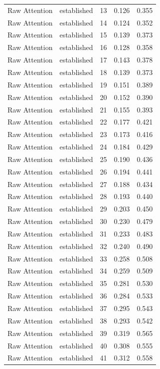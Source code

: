 \begin{tabular}{llrrr}
Raw Attention & established & 13 & 0.126 & 0.355 \\
Raw Attention & established & 14 & 0.124 & 0.352 \\
Raw Attention & established & 15 & 0.139 & 0.373 \\
Raw Attention & established & 16 & 0.128 & 0.358 \\
Raw Attention & established & 17 & 0.143 & 0.378 \\
Raw Attention & established & 18 & 0.139 & 0.373 \\
Raw Attention & established & 19 & 0.151 & 0.389 \\
Raw Attention & established & 20 & 0.152 & 0.390 \\
Raw Attention & established & 21 & 0.155 & 0.393 \\
Raw Attention & established & 22 & 0.177 & 0.421 \\
Raw Attention & established & 23 & 0.173 & 0.416 \\
Raw Attention & established & 24 & 0.184 & 0.429 \\
Raw Attention & established & 25 & 0.190 & 0.436 \\
Raw Attention & established & 26 & 0.194 & 0.441 \\
Raw Attention & established & 27 & 0.188 & 0.434 \\
Raw Attention & established & 28 & 0.193 & 0.440 \\
Raw Attention & established & 29 & 0.203 & 0.450 \\
Raw Attention & established & 30 & 0.230 & 0.479 \\
Raw Attention & established & 31 & 0.233 & 0.483 \\
Raw Attention & established & 32 & 0.240 & 0.490 \\
Raw Attention & established & 33 & 0.258 & 0.508 \\
Raw Attention & established & 34 & 0.259 & 0.509 \\
Raw Attention & established & 35 & 0.281 & 0.530 \\
Raw Attention & established & 36 & 0.284 & 0.533 \\
Raw Attention & established & 37 & 0.295 & 0.543 \\
Raw Attention & established & 38 & 0.293 & 0.542 \\
Raw Attention & established & 39 & 0.319 & 0.565 \\
Raw Attention & established & 40 & 0.308 & 0.555 \\
Raw Attention & established & 41 & 0.312 & 0.558 \\

\end{tabular}
